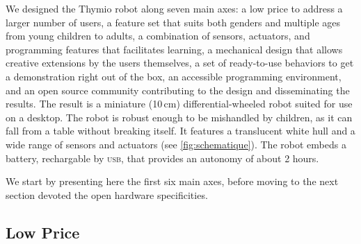 \documentclass[letterpaper, 10 pt, conference]{ieeeconf}  %
\begin{document}
We designed the Thymio robot along seven main axes: a low price to address a larger number of users, a feature set that suits both genders and multiple ages from young children to adults, a combination of sensors, actuators, and programming features that facilitates learning, a mechanical design that allows creative extensions by the users themselves, a set of ready-to-use behaviors to get a demonstration right out of the box, an accessible programming environment, and an open source  community contributing to the design and disseminating the results.
The result is a miniature (10\,cm) differential-wheeled robot suited for use on a desktop.
The robot is robust enough to be mishandled by children, as it can fall from a table without breaking itself.
It features a translucent white hull and a wide range of sensors and actuators (see \ref{fig:schematique}).
The robot embeds a battery, rechargable by \textsc{usb}, that provides an autonomy of about 2 hours.

We start by presenting here the first six main axes, before moving to the next section devoted the open hardware specificities.

\subsection{Low Price}
\end{document}

